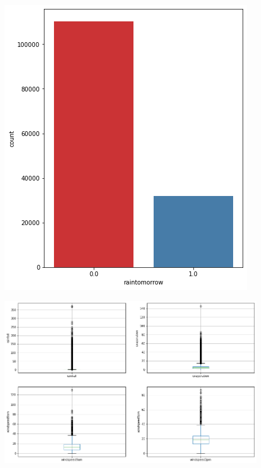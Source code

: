 \documentclass{beamer}
\begin{document}
\begin{frame}[plain]
    \begin{figure}
        \includegraphics[width=.6\textwidth]{images/imbalance.png}
    \end{figure}
\end{frame}

\begin{frame}[plain]
    \begin{figure}
        \includegraphics[width=\textwidth]{images/outliers.png}
    \end{figure}
\end{frame}
\end{document}
